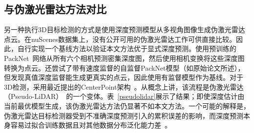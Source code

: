 \begin{table}[t] 
\begin{center}
\caption{重叠区域对比。$\ddag$：该模型使用深度权重1.0训练，并从FCOS3D检查点初始化；该检查点在同一数据集上使用深度权重0.2训练。详见\cite{wang2021fcos3d}。$\dag$：本文方法同样从FCOS3D骨干网络初始化；检测头随机初始化。\label{table:overlap}}
\end{center}
\end{table}


\subsection{与伪激光雷达方法对比}
\label{pseudo}
另一种执行3D目标检测的方式是使用深度预测模型从多视角图像生成伪激光雷达点云。在nuScenes数据集上，没有公开可用的伪激光雷达工作可供直接比较。因此，自行实现一个基线方法以验证本文方法优于显式深度预测。使用预训练的PackNet~\cite{packnet}网络从所有六个相机预测密集深度图，然后使用相机变换将这些深度图转换为点云。还尝试了带有速度监督的自监督PackNet模型（如原始论文所述），但发现真值深度监督能生成更真实的点云，因此使用有监督模型作为基线。对于3D检测，采用最近提出的CenterPoint架构~\cite{yin2021center}。从概念上讲，该流程是伪激光雷达（Pseudo-LiDAR）~\cite{wang2019pseudo}的一个变体。表~\ref{pseudolidar}展示了结果；即使深度估计由当前最优模型生成，该伪激光雷达方法仍显著不如本文方法。一个可能的解释是，伪激光雷达目标检测器受到不准确深度预测引入的累积误差的影响，而深度预测本身容易过拟合训练数据且对其他数据分布泛化能力差~\cite{demistifying}。%

